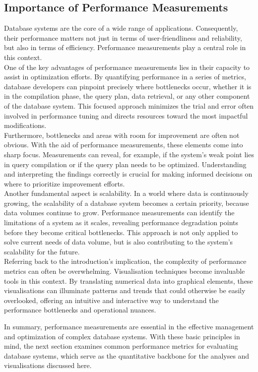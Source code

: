 \subsection{Importance of Performance Measurements}
Database systems are the core of a wide range of applications. Consequently, their performance matters not just in terms of user-friendliness and reliability, but also in terms of efficiency. Performance measurements play a central role in this context.\\
One of the key advantages of performance measurements lies in their capacity to assist in optimization efforts. By quantifying performance in a series of metrics, database developers can pinpoint precisely where bottlenecks occur, whether it is in the compilation phase, the query plan, data retrieval, or any other component of the database system. This focused approach minimizes the trial and error often involved in performance tuning and directs resources toward the most impactful modifications.\\
Furthermore, bottlenecks and areas with room for improvement are often not obvious. With the aid of performance measurements, these elements come into sharp focus. Measurements can reveal, for example, if the system's weak point lies in query compilation or if the query plan needs to be optimized. Understanding and interpreting the findings correctly is crucial for making informed decisions on where to prioritize improvement efforts.\\
Another fundamental aspect is scalability. In a world where data is continuously growing, the scalability of a database system becomes a certain priority, because data volumes continue to grow. Performance measurements can identify the limitations of a system as it scales, revealing performance degradation points before they become critical bottlenecks. This approach is not only applied to solve current needs of data volume, but is also contributing to the system's scalability for the future.\\
Referring back to the introduction's implication, the complexity of performance metrics can often be overwhelming. Visualisation techniques become invaluable tools in this context. By translating numerical data into graphical elements, these visualisations can illuminate patterns and trends that could otherwise be easily overlooked, offering an intuitive and interactive way to understand the performance bottlenecks and operational nuances.

In summary, performance measurements are essential in the effective management and optimization of complex database systems. With these basic principles in mind, the next section examines common performance metrics for evaluating database systems, which serve as the quantitative backbone for the analyses and visualisations discussed here.

